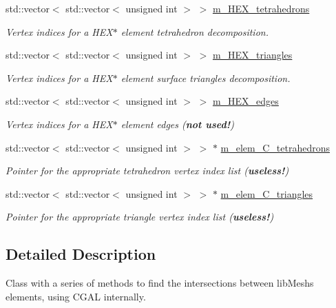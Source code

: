 \begin{DoxyCompactItemize}
std\+::vector$<$ std\+::vector$<$ unsigned int $>$ $>$ \hyperlink{classcarl_1_1_intersection___tools_af74ec1bcb1a896df19642d340dd2762c}{m\+\_\+\+H\+E\+X\+\_\+tetrahedrons}
\begin{DoxyCompactList}\small\item\em Vertex indices for a H\+E\+X$\ast$ element tetrahedron decomposition. \end{DoxyCompactList}\item 
std\+::vector$<$ std\+::vector$<$ unsigned int $>$ $>$ \hyperlink{classcarl_1_1_intersection___tools_aca79d0350f0969670dd9d06814c26583}{m\+\_\+\+H\+E\+X\+\_\+triangles}
\begin{DoxyCompactList}\small\item\em Vertex indices for a H\+E\+X$\ast$ element surface triangles decomposition. \end{DoxyCompactList}\item 
std\+::vector$<$ std\+::vector$<$ unsigned int $>$ $>$ \hyperlink{classcarl_1_1_intersection___tools_a418dc03e4edc3f5bba1f78f6fc5afe71}{m\+\_\+\+H\+E\+X\+\_\+edges}
\begin{DoxyCompactList}\small\item\em Vertex indices for a H\+E\+X$\ast$ element edges ({\bfseries not used!}) \end{DoxyCompactList}\item 
std\+::vector$<$ std\+::vector$<$ unsigned int $>$ $>$ $\ast$ \hyperlink{classcarl_1_1_intersection___tools_a2f6b6fff82b9a02400d3aeb3db1f4c82}{m\+\_\+elem\+\_\+\+C\+\_\+tetrahedrons}
\begin{DoxyCompactList}\small\item\em Pointer for the appropriate tetrahedron vertex index list ({\bfseries useless!}) \end{DoxyCompactList}\item 
std\+::vector$<$ std\+::vector$<$ unsigned int $>$ $>$ $\ast$ \hyperlink{classcarl_1_1_intersection___tools_a89a78135b49b49c32bec8be4016782b3}{m\+\_\+elem\+\_\+\+C\+\_\+triangles}
\begin{DoxyCompactList}\small\item\em Pointer for the appropriate triangle vertex index list ({\bfseries useless!}) \end{DoxyCompactList}\end{DoxyCompactItemize}


\subsection{Detailed Description}
Class with a series of methods to find the intersections between lib\+Mesh\textquotesingle{}s elements, using C\+G\+A\+L internally. 

